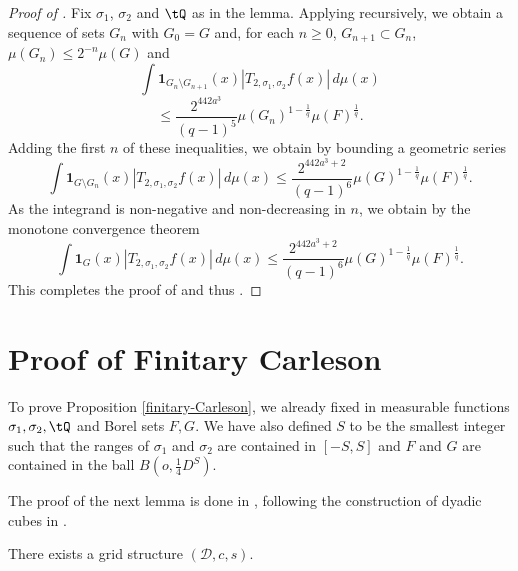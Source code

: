 \begin{proof}[Proof of ]
\leanok
Fix $\sigma_1$, $\sigma_2$ and $\tQ$ as in the lemma. Applying  recursively, we obtain a sequence of sets $G_n$ with $G_0=G$ and, for each $n\ge 0$, $G_{n+1} \subset G_n$, $\mu(G_{n})\le 2^{-n} \mu(G)$ and
\begin{equation*}
    \int \mathbf{1}_{G_{n}\setminus G_{n+1}}(x)
    \left| {T}_{2,\sigma_1,\sigma_2} f(x) \right|\, d\mu(x)
\end{equation*}
\begin{equation}
    \le \frac{2^{442a^3}}{(q-1)^5} \mu(G_n)^{1 - \frac{1}{q}} \mu(F)^{\frac{1}{q}}.
\end{equation}
Adding the first $n$ of these inequalities, we obtain by bounding a geometric series
    \begin{equation} \label{Sqcut2}
    \int \mathbf{1}_{G\setminus G_{n}}(x)
\left| {T}_{2,\sigma_1,\sigma_2}f(x) \right|\, d\mu(x)
\le \frac{2^{442a^3+2}}{(q-1)^6} \mu(G)^{1-\frac{1}{q}} \mu(F)^{\frac{1}{q}}.
\end{equation}
As the integrand is non-negative and non-decreasing in $n$, we obtain by the monotone convergence theorem
 \begin{equation} \label{Sqcut3}
    \int \mathbf{1}_{G}(x)
\left| {T}_{2,\sigma_1,\sigma_2}f(x) \right|\, d\mu(x)
\le \frac{2^{442a^3+2}}{(q-1)^6} \mu(G)^{1-\frac{1}{q}} \mu(F)^{\frac{1}{q}}.
\end{equation}
This completes the proof of 
and thus .
\end{proof}

\section{Proof of Finitary Carleson}
\label{christsection}

To prove Proposition
\ref{finitary-Carleson}, we already fixed in 
measurable functions ${\sigma_1},\sigma_2, \tQ$ and Borel sets $F,G$. We have also
defined $S$ to be the smallest
integer such that the ranges of
$\sigma_1$ and $\sigma_2$ are contained in $[-S,S]$ and $F$ and $G$ are contained
in the ball $B(o, \frac 14 D^S)$.


The proof of the next lemma is done in ,
following the construction of dyadic cubes in \cite[\S 3]{christ1990b}.

\begin{lemma}
    \label{grid-existence}
    \leanok
     There exists a grid structure $(\mathcal{D}, c,s)$.
\end{lemma}




